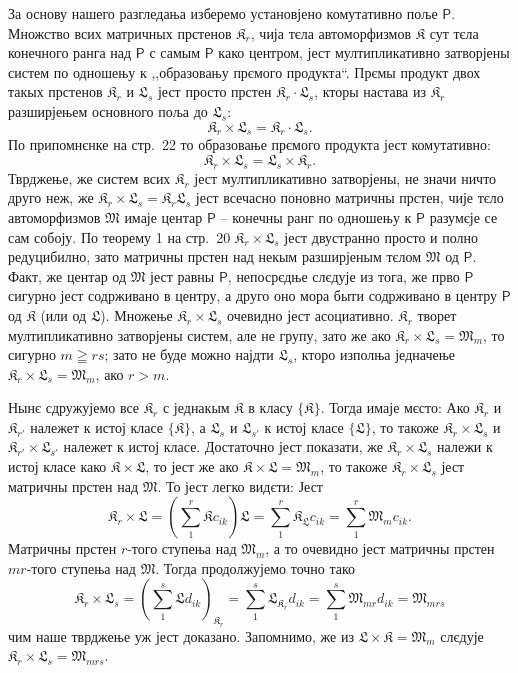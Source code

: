 \documentclass[11pt]{article}
\begin{document}
За основу нашего разгледања изберемо установјено комутативно поље \(\mathsf P\). Множство всих матричных прстенов \(\mathfrak K_r\), чија тєла автоморфизмов \(\mathfrak K\) сут тєла конечного ранга над \(\mathsf P\) с самым \(\mathsf P\) како центром, јест мултипликативно затворјены систем по одношењу к ,,образовању прємого продукта``. Прємы продукт двох такых прстенов \(\mathfrak K_r\) и \(\mathfrak L_s\) јест просто прстен \(\mathfrak K_r\cdot\mathfrak L_s\), кторы настава из \(\mathfrak K_r\) разширјењем основного поља до \(\mathfrak L_s\):
\[
\mathfrak K_r\times\mathfrak L_s=\mathfrak K_r\cdot\mathfrak L_s.
\]
По припомнєнке на стр.~22 то образовање прємого продукта јест комутативно:
\[
\mathfrak K_r\times\mathfrak L_s=\mathfrak L_s\times\mathfrak K_r.
\]
Тврджење, же систем всих \(\mathfrak K_r\) јест мултипликативно затворјены, не значи ничто друго неж, же \(\mathfrak K_r\times\mathfrak L_s=\mathfrak K_r\mathfrak L_s\) јест всечасно поновно матричны прстен, чије тєло автоморфизмов \(\mathfrak M\) имаје центар \(\mathsf P\) -- конечны ранг по одношењу к \(\mathsf P\) разумєје се сам собоју. По теорему 1 на стр.~20 \(\mathfrak K_r\times\mathfrak L_s\) јест двустранно просто и полно редуцибилно, зато матричны прстен над некым разширјеным тєлом \(\mathfrak M\) од \(\mathsf P\). Факт, же центар од \(\mathfrak M\) јест равны \(\mathsf P\), непосрєдње слєдује из тога, же прво \(\mathsf P\) сигурно јест содрживано в центру, а друго оно мора быти содрживано в центру \(\mathsf P\) од \(\mathfrak K\) (или од \(\mathfrak L\)). Множење \(\mathfrak K_r\times\mathfrak L_s\) очевидно јест асоциативно. \(\mathfrak K_r\) творет мултипликативно затворјены систем, але не групу, зато же ако \(\mathfrak K_r\times\mathfrak L_s=\mathfrak M_m\), то сигурно \(m\geqq rs\); зато не буде можно најдти \(\mathfrak L_s\), кторо изполња једначење \(\mathfrak K_r\times\mathfrak L_s=\mathfrak M_m\), ако \(r>m\).

Нынє сдружујемо все \(\mathfrak K_r\) с једнакым \(\mathfrak K\) в класу \(\{\mathfrak K\}\). Тогда имаје мєсто: Ако \(\mathfrak K_r\) и \(\mathfrak K_{r'}\) належет к истој класе \(\{\mathfrak K\}\), а \(\mathfrak L_s\) и \(\mathfrak L_{s'}\) к истој класе \(\{\mathfrak L\}\), то такоже \(\mathfrak K_r\times\mathfrak L_s\) и \(\mathfrak K_{r'}\times\mathfrak L_{s'}\) належет к истој класе. Достаточно јест показати, же \(\mathfrak K_r\times\mathfrak L_s\) належи к истој класе како \(\mathfrak K\times\mathfrak L\), то јест же ако \(\mathfrak K\times\mathfrak L=\mathfrak M_m\), то такоже \(\mathfrak K_r\times\mathfrak L_s\) јест матричны прстен над \(\mathfrak M\). То јест легко видєти: Јест
\[
\mathfrak K_r\times\mathfrak L
=\left(\sum_1^r\mathfrak K c_{ik}\right)\mathfrak L
=\sum_1^r\mathfrak K_{\mathfrak L}c_{ik}
=\sum_1^r\mathfrak M_m c_{ik}.
\]
Матричны прстен \(r\)-того ступења над \(\mathfrak M_m\), а то очевидно јест матричны прстен \(mr\)-того ступења над \(\mathfrak M\). Тогда продолжујемо точно тако
\[
\mathfrak K_r\times\mathfrak L_s
=\left(\sum_1^s\mathfrak L d_{ik}\right)_{\mathfrak K_r}
=\sum_1^s\mathfrak L_{\mathfrak K_r}d_{ik}
=\sum_1^s\mathfrak M_{mr}d_{ik}
=\mathfrak M_{mrs}
\]
чим наше тврджење уж јест доказано. Запомнимо, же из \(\mathfrak L\times\mathfrak K=\mathfrak M_m\) слєдује \(\mathfrak K_r\times\mathfrak L_s=\mathfrak M_{mrs}\).
\end{document}
